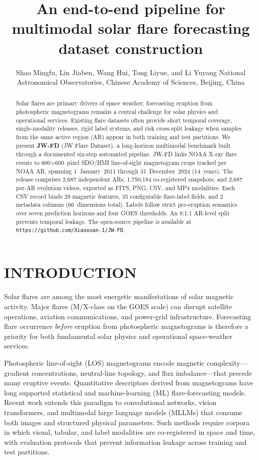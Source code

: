 \documentclass[]{spie}
\title{An end-to-end pipeline for multimodal solar flare forecasting dataset construction}
\author{Shao Mingfu\supit{a}, Lin Jiaben\supit{a}, Wang Hui\supit{a}, Tong Liyue\supit{a}, and Li Yuyang\supit{a}
\skiplinehalf
\supit{a}National Astronomical Observatories, Chinese Academy of Sciences, Beijing, China
}
\begin{document}
\maketitle

\begin{abstract}
Solar flares are primary drivers of space weather; forecasting eruption from photospheric magnetograms remains a central challenge for solar physics and operational services. Existing flare datasets often provide short temporal coverage, single-modality releases, rigid label systems, and risk cross-split leakage when samples from the same active region (AR) appear in both training and test partitions. We present \textbf{JW-FD} (JW Flare Dataset), a long-horizon multimodal benchmark built through a documented six-step automated pipeline. JW-FD links NOAA X-ray flare events to 600$\times$600~pixel SDO/HMI line-of-sight magnetogram crops tracked per NOAA AR, spanning 1~January~2011 through 31~December~2024 (14~years). The release comprises 2{,}687 independent ARs, 1{,}750{,}184 co-registered snapshots, and 2{,}687 per-AR evolution videos, exported as FITS, PNG, CSV, and MP4 modalities. Each CSV record binds 29 magnetic features, 35 configurable flare-label fields, and 2 metadata columns (66~dimensions total). Labels follow strict pre-eruption semantics over seven prediction horizons and four GOES thresholds. An 8:1:1 AR-level split prevents temporal leakage. The open-source pipeline is available at \texttt{https://github.com/Xiaoxuan-1/JW-FD}.
\end{abstract}


\section{INTRODUCTION}
\label{sec:intro}

Solar flares are among the most energetic manifestations of solar magnetic activity. Major flares (M/X-class on the GOES scale) can disrupt satellite operations, aviation communications, and power-grid infrastructure. Forecasting flare occurrence \emph{before} eruption from photospheric magnetograms is therefore a priority for both fundamental solar physics and operational space-weather services.\cite{Shao2025review,Toriumi2019,Leka2019}

Photospheric line-of-sight (LOS) magnetograms encode magnetic complexity---gradient concentrations, neutral-line topology, and flux imbalance---that precede many eruptive events.\cite{Boucheron2015,Bobra2014} Quantitative descriptors derived from magnetograms have long supported statistical and machine-learning (ML) flare-forecasting models. Recent work extends this paradigm to convolutional networks, vision transformers, and multimodal large language models (MLLMs) that consume both images and structured physical parameters.\cite{Shao2025jwflare,Shao2026jwvl} Such methods require corpora in which visual, tabular, and label modalities are co-registered in space and time, with evaluation protocols that prevent information leakage across training and test partitions.
\end{document}
